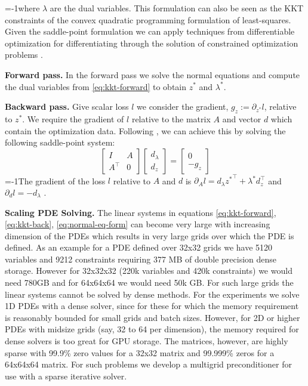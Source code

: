 \looseness=-1where $\lambda$ are the dual variables.
This formulation can also be seen as the KKT constraints of the convex quadratic programming formulation of least-squares.
Given the saddle-point formulation we can apply techniques from differentiable optimization for differentiating through the solution of constrained optimization problems \cite{amos2017optnet}.

\textbf{Forward pass.} In the forward pass we solve the normal equations and compute the dual variables from \ref{eq:kkt-forward} to obtain $z^*$ and $\lambda^*$.

\textbf{Backward pass.} Give scalar loss $l$ we consider the gradient, $g_z := \partial_{z^*} l$, relative to $z^*$. 
We require the gradient of $l$ relative to the matrix $A$ and vector $d$ which contain the optimization data.
Following \citet{amos2017optnet}, we can achieve this by solving the following saddle-point system:
\begin{equation}
\begin{bmatrix}
I & A \\ 
A^\intercal & 0
\end{bmatrix}
\begin{bmatrix}
d_\lambda\\
d_z
\end{bmatrix}
= 
\begin{bmatrix}
0\\
-g_z
\end{bmatrix}\label{eq:kkt-back}
\end{equation}
\looseness=-1The gradient of the loss $l$ relative to $A$ and $d$ is $\partial_A l = d_\lambda {z^*}^\intercal + \lambda^* d_z^\intercal$ and $\partial_d l  = -d_\lambda$ \cite{amos2017optnet}.

\textbf{Scaling PDE Solving.}
The linear systems in equations \eqref{eq:kkt-forward}, \eqref{eq:kkt-back}, \eqref{eq:normal-eq-form} can become very large with increasing dimension of the PDEs which results in very large grids over which the PDE is defined.
As an example for a PDE defined over 32x32 grids we have 5120 variables and 9212 constraints requiring 377 MB of double precision dense storage.
However for 32x32x32 (220k variables and 420k constraints)  we would need 780GB and for 64x64x64 we would need 50k GB.
For such large grids the linear systems cannot be solved by dense methods.
For the experiments we solve 1D PDEs with a dense solver, since for these for which the memory requirement is reasonably bounded for small grids and batch sizes.
However, for 2D or higher PDEs with midsize grids (say, 32 to 64 per dimension), the memory required for dense solvers is too great for GPU storage.
The matrices, however, are highly sparse with 99.9\% zero values for a 32x32 matrix and 99.999\% zeros for a 64x64x64 matrix.
For such problems we develop a multigrid preconditioner for use with a sparse iterative solver.
\endgroup

